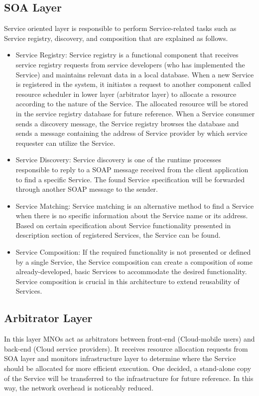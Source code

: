 \documentclass[conference]{IEEEtran}
\begin{document}
\subsection{SOA Layer} 
Service oriented layer is responsible to perform Service-related tasks such as Service registry, discovery, and composition that are explained as follows.

\begin{itemize}
\item Service Registry: Service registry is a functional component that receives service registry requests from service developers (who has implemented the Service) and maintains relevant data in a local database. When a new Service is registered in the system, it initiates a request to another component called resource scheduler in lower layer (arbitrator layer) to allocate a resource according to the nature of the Service. The allocated resource will be stored in the service registry database for future reference. When a Service consumer sends a discovery message, the Service registry browses the database and sends a message containing the address of Service provider by which service requester can utilize the Service.

\item Service Discovery: Service discovery is one of the runtime processes responsible to reply to a SOAP message received from the client application to find a specific Service. The found Service specification will be forwarded through another SOAP message to the sender.

\item Service Matching: Service matching is an alternative method to find a Service when there is no specific information about the Service name or its address. Based on certain specification about Service functionality presented in description section of registered Services, the Service can be found.

\item Service Composition: If the required functionality is not presented or defined by a single Service, the Service composition can create a composition of some already-developed, basic Services to accommodate the desired functionality. Service composition is crucial in this architecture to extend reusability of Services.

\end{itemize}
\subsection{Arbitrator Layer} 
In this layer MNOs act as arbitrators between front-end (Cloud-mobile users) and back-end (Cloud service providers). It receives resource allocation requests from SOA layer and monitors infrastructure layer to determine where the Service should be allocated for more efficient execution. One decided, a stand-alone copy of the Service will be transferred to the infrastructure for future reference. In this way, the network overhead is noticeably reduced. 
\end{document}
